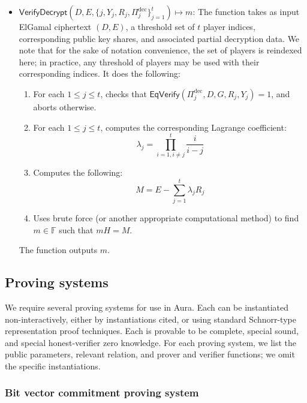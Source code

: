 \documentclass{llncs}
\newcommand{\F}{\mathbb{F}}
\newcommand{\func}[1]{\mathsf{#1}}
\begin{document}
\begin{itemize}
    \item $\func{VerifyDecrypt}(D, E, \{j, Y_j, R_j, \Pi_j^{\text{dec}}\}_{j=1}^t) \mapsto m$: The function takes as input ElGamal ciphertext $(D, E)$, a threshold set of $t$ player indices, corresponding public key shares, and associated partial decryption data.
    We note that for the sake of notation convenience, the set of players is reindexed here; in practice, any threshold of players may be used with their corresponding indices.
    It does the following:
    \begin{enumerate}
        \item For each $1 \leq j \leq t$, checks that $\func{EqVerify}(\Pi_j^{\text{dec}}, D, G, R_j, Y_j) = 1$, and aborts otherwise.
        \item For each $1 \leq j \leq t$, computes the corresponding Lagrange coefficient: \[ \lambda_j = \prod_{i=1, i \neq j}^t \frac{i}{i - j} \]
        \item Computes the following: \[ M = E - \sum_{j=1}^t \lambda_j R_j \]
        \item Uses brute force (or another appropriate computational method) to find $m \in \F$ such that $mH = M$.
    \end{enumerate}
    The function outputs $m$.
\end{itemize}


\subsection{Proving systems}

We require several proving systems for use in Aura.
Each can be instantiated non-interactively, either by instantiations cited, or using standard Schnorr-type representation proof techniques.
Each is provable to be complete, special sound, and special honest-verifier zero knowledge.
For each proving system, we list the public parameters, relevant relation, and prover and verifier functions; we omit the specific instantiations.


\subsubsection{Bit vector commitment proving system}
\end{document}
